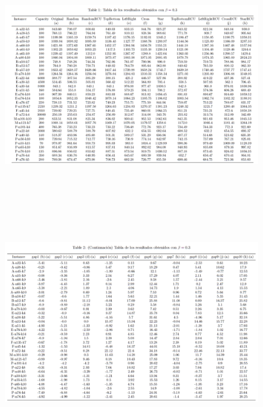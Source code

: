 \documentclass[11pt]{article} %
\begin{document}
\begin{enumerate}
\begin{figure}[H]
\centering
\includegraphics[width=\linewidth, height=10cm]{table031.png} 
\end{figure}
\begin{figure}[H]
\includegraphics[width=\linewidth, height=10cm]{table032.png} 
\label{fig:subim1}
\end{figure}


\end{enumerate}
\end{document}
